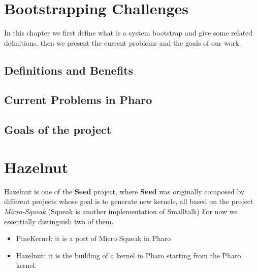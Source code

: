 \documentclass{book}
\begin{document}

\chapter{Bootstrapping Challenges}

In this chapter we first define what is a system bootstrap and give some related definitions, then we present the current problems and the goals of our work.

	\section{Definitions and Benefits}
	\section{Current Problems in Pharo}\label{BootStrap}
	\section{Goals of the project}


\chapter{Hazelnut}

Hazelnut is one of the \textbf{Seed} project, where \textbf{Seed} was originally composed by different projects whose goal is to generate new kernels, all based on the project \emph{Micro-Squeak} (Squeak is another implementation of Smalltalk)
For now we essentially distinguish two of them. 
\begin{itemize}
	\item PineKernel: it is a port of \gls{Micro Squeak} in Pharo
	\item Hazelnut: it is the building of a kernel in Pharo starting from the Pharo kernel.
\end{itemize}
\end{document}
